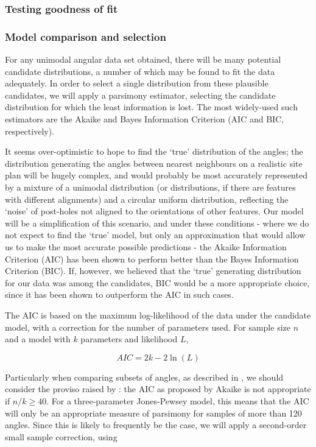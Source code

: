 \documentclass[../../ArchStats.tex]{subfiles}
\begin{document}
\subsubsection{Testing goodness of fit}

\subsubsection{Model comparison and selection}

For any unimodal angular data set obtained, there will be many potential candidate distributions, a number of which may be found to fit the data adequately. In order to select a single distribution from these plausible candidates, we will apply a parsimony estimator, selecting the candidate distribution for which the least information is lost. The most widely-used such estimators are the Akaike and Bayes Information Criterion (AIC and BIC, respectively).

It seems over-optimistic to hope to find the `true' distribution of the angles; the distribution generating the angles between nearest neighbours on a realistic site plan will be hugely complex, and would probably be most accurately represented by a mixture of a unimodal distribution (or distributions, if there are features with different alignments) and a circular uniform distribution, reflecting the `noise'  of post-holes not aligned to the orientations of other features. Our model will be a simplification of this scenario, and under these conditions - where we do not expect to find the `true' model, but only an approximation that would allow us to make the most accurate possible predictions - the Akaike Information Criterion (AIC) has been shown to perform better than the Bayes Information Criterion (BIC)\cite{aho2014}. If, however, we believed that the `true' generating distribution for our data was among the candidates, BIC would be a more appropriate choice, since it has been shown to outperform the AIC in such cases. 

The AIC is based on the maximum log-likelihood of the data under the candidate model, with a correction for the number of parameters used\cite{Akaike1974}. For sample size $n$ and a model with $k$ parameters and likelihood $L$, 

\[AIC = 2k - 2 \ln (L)\]

Particularly when comparing subsets of angles, as described in , we should consider the proviso raised by \cite{Burnham2004}: the AIC as proposed by Akaike  is not appropriate if $n/k \geq 40$. For a three-parameter Jones-Pewsey model, this means that the AIC will only be an appropriate measure of parsimony for samples of more than 120 angles. Since this is likely to frequently be the case, we will apply a second-order small sample correction, using
\end{document}
